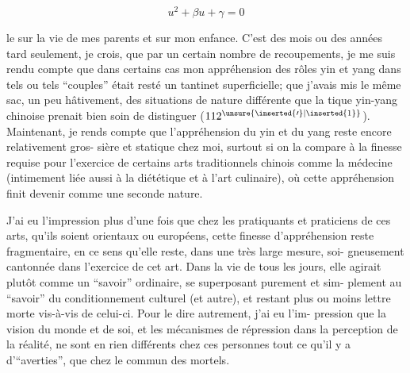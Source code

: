 \[u^2+\beta u+\gamma=0\]

le sur la vie de mes parents et sur mon enfance. C'est des mois ou des années 
tard seulement, je crois, que par un certain nombre de recoupements, je me suis
rendu compte que dans certains cas mon appréhension des rôles yin et yang dans
tels ou tels ``couples'' était resté un tantinet superficielle; que j'avais mis 
le même sac, un peu hâtivement, des situations de nature différente que la 
tique yin-yang chinoise prenait bien soin de distinguer ($112^{\unsure{\inserted{\prime}|\inserted{1}}}$). Maintenant, je 
rends compte que l'appréhension du yin et du yang reste encore relativement gros-
sière et statique chez moi, surtout si on la compare à la finesse requise pour
l'exercice de certains arts traditionnels chinois comme la médecine (intimement
liée aussi à la diététique et à l'art culinaire), où cette appréhension finit 
devenir comme une seconde nature.

J'ai eu l'impression plus d'une fois que chez les pratiquants et praticiens
de ces arts, qu'ils soient orientaux ou européens, cette finesse d'appréhension
reste fragmentaire, en ce sens qu'elle reste, dans une très large mesure, soi-
gneusement cantonnée dans l'exercice de cet art. Dans la vie de tous les jours,
elle agirait plutôt comme un ``savoir'' ordinaire, se superposant purement et sim-
plement au ``savoir'' du conditionnement culturel (et autre), et restant plus ou
moins lettre morte vis-à-vis de celui-ci. Pour le dire autrement, j'ai eu l'im-
pression que la vision du monde et de soi, et les mécanismes de répression dans
la perception de la réalité, ne sont en rien différents chez ces personnes tout
ce qu'il y a d'``averties'', que chez le commun des mortels.

